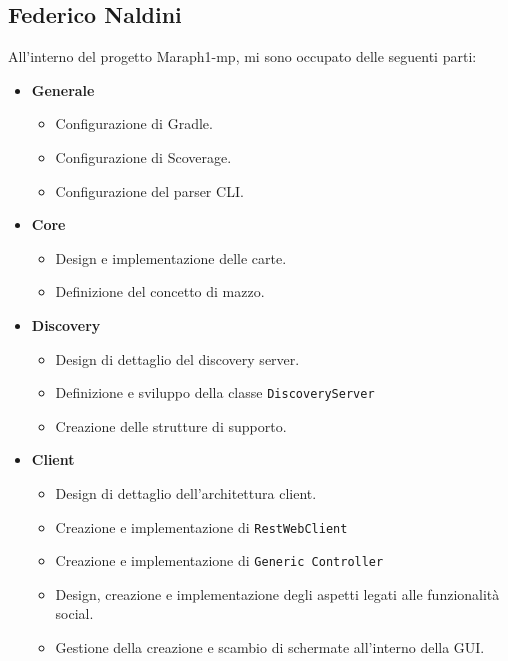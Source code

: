         \subsection{Federico Naldini}\label{subsec:naldini}
All'interno del progetto Maraph1-mp, mi sono occupato delle seguenti parti:
\begin{itemize}
	\item{\textbf{Generale}}
	 \begin{itemize}
	 	\item Configurazione di Gradle.
	 	\item Configurazione di Scoverage.
	 	\item Configurazione del parser CLI.
	 \end{itemize}

\item{\textbf{Core}}
\begin{itemize}
	\item Design e implementazione delle carte.
	\item Definizione del concetto di mazzo.
\end{itemize}

\item{\textbf{Discovery}}
\begin{itemize}
	\item Design di dettaglio del discovery server.
	\item Definizione e sviluppo della classe \texttt{DiscoveryServer}
	\item Creazione delle strutture di supporto.
\end{itemize}

\item{\textbf{Client}}
\begin{itemize}
	\item Design di dettaglio dell'architettura client.
	\item Creazione e implementazione di \texttt{RestWebClient}
	\item Creazione e implementazione di \texttt{Generic Controller}
	\item Design, creazione e implementazione degli aspetti legati alle funzionalità social.
	\item Gestione della creazione e scambio di schermate all'interno della GUI.
\end{itemize}

\end{itemize}

